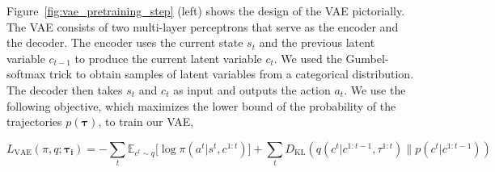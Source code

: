 \documentclass{article} %
\begin{document}
Figure~\ref{fig:vae_pretraining_step} (left) shows the design of the VAE pictorially. The VAE consists of two multi-layer perceptrons that serve as the encoder and the decoder. The encoder uses the current state $s_t$ and the previous latent variable $c_{t-1}$ to produce the current latent variable $c_t$. We used the Gumbel-softmax trick \citep{jang2016categorical} to obtain samples of latent variables from a categorical distribution. The decoder then takes $s_t$ and $c_t$ as input and outputs the action $a_t$. We use the following objective, which maximizes the lower bound of the probability of the trajectories $p(\boldsymbol{\tau})$, to train our VAE,

\begin{equation}
L_{\text{VAE}}(\pi, q; \boldsymbol{\tau_i}) = - \sum_{t} \mathbb{E}_{c^{t} \sim q} \Big[\log \pi(a^t | s^{t}, c^{1:t})\Big] + \sum_{t} D_{\text{KL}}(q(c^{t} | c^{1:t-1}, \tau^{1:t}) \| p(c^{t} | c^{1:t-1}))
\label{eq:loss_vae}
\end{equation}
\end{document}
